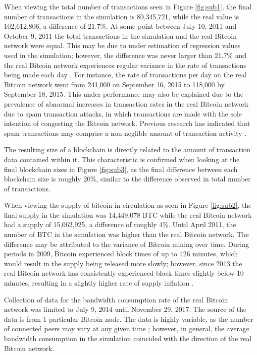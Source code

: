 \documentclass[12pt]{report}
\begin{document}
When viewing the total number of transactions seen in Figure \ref{fig:sub1}, the final number of transactions in the simulation is 80,345,721, while the real value is 102,612,806, a difference of 21.7\%. At some point between July 10, 2011 and October 9, 2011 the total transactions in the simulation and the real Bitcoin network were equal. This may be due to under estimation of regression values used in the simulation; however, the difference was never larger than 21.7\% and the real Bitcoin network experiences regular variance in the rate of transactions being made each day \cite{blockchain.info.}. For instance, the rate of transactions per day on the real Bitcoin network went from 241,000 on September 16, 2015 to 118,000 by September 18, 2015. This under performance may also be explained due to the prevalence of abnormal increases in transaction rates in the real Bitcoin network due to spam transaction attacks, in which transactions are made with the sole intention of congesting the Bitcoin network. Previous research has indicated that spam transactions may comprise a non-neglible amount of transaction activity \cite{Baqer.2016}. 

The resulting size of a blockchain is directly related to the amount of transaction data contained within it. This characteristic is confirmed when looking at the final blockchain sizes in Figure \ref{fig:sub3}, as the final difference between each blockchain size is roughly 20\%, similar to the difference observed in total number of transactions.

When viewing the supply of bitcoin in circulation as seen in Figure \ref{fig:sub2}, the final supply in the simulation was 14,449,078 BTC while the real Bitcoin network had a supply of 15,062,925, a difference of roughly 4\%. Until April 2011, the number of BTC in the simulation was higher than the real Bitcoin network. The difference may be attributed to the variance of Bitcoin mining over time. During periods in 2009, Bitcoin experienced block times of up to 426 minutes, which would result in the supply being released more slowly; however, since 2013 the real Bitcoin network has consistently experienced block times slightly below 10 minutes, resulting in a slightly higher rate of supply inflation \cite{bitcoinity.org.}.

Collection of data for the bandwidth consumption rate of the real Bitcoin network was limited to July 9, 2014 until November 29, 2017. The source of the data is from 1 particular Bitcoin node. The data is highly variable, as the number of connected peers may vary at any given time \cite{Lopp.2017}; however, in general, the average bandwidth consumption in the simulation coincided with the direction of the real Bitcoin network.
\end{document}
